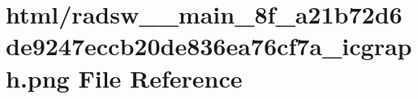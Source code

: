 \hypertarget{radsw____main__8f__a21b72d6de9247eccb20de836ea76cf7a__icgraph_8png}{}\section{html/radsw\+\_\+\+\_\+main\+\_\+8f\+\_\+a21b72d6de9247eccb20de836ea76cf7a\+\_\+icgraph.png File Reference}
\label{radsw____main__8f__a21b72d6de9247eccb20de836ea76cf7a__icgraph_8png}
